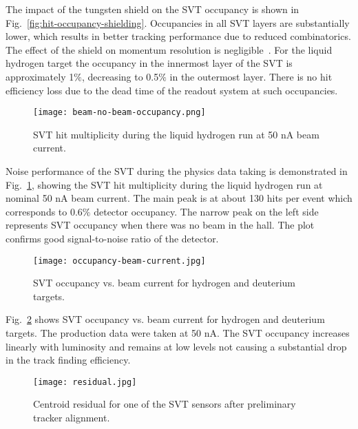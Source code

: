 The impact of the tungsten shield on the SVT occupancy is shown in Fig.~\ref{fig:hit-occupancy-shielding}. Occupancies in all SVT layers are substantially lower, which results in better tracking performance due to reduced combinatorics. The effect of the shield on momentum resolution is negligible~\cite{SHIELDNOTE}. For the liquid hydrogen target the occupancy in the innermost layer of the SVT is approximately 1$\%$, decreasing to 0.5$\%$ in the outermost layer. There is no hit efficiency loss due to the dead time of the readout system at such occupancies.

\begin{figure}[hbt] 
\centering 
\texttt{[image: beam-no-beam-occupancy.png]}
\caption{SVT hit multiplicity during the liquid hydrogen run at 50 nA beam current.}
\label{fig:beam-no-beam-occupancy}
\end{figure}

Noise performance of the SVT during the physics data taking is demonstrated in Fig.~\ref{fig:beam-no-beam-occupancy}, showing the SVT hit multiplicity during the liquid hydrogen run at nominal 50 nA beam current. The main peak is at about 130 hits per event which corresponds to 0.6$\%$ detector occupancy. The narrow peak on the left side represents SVT occupancy when there was no beam in the hall. The plot confirms good signal-to-noise ratio of the detector. 

\begin{figure}[hbt] 
\centering 
\texttt{[image: occupancy-beam-current.jpg]}
\caption{SVT occupancy vs. beam current for hydrogen and deuterium targets.}
\label{fig:occupancy-beam-current}
\end{figure}

Fig.~\ref{fig:occupancy-beam-current} shows SVT occupancy vs. beam current for hydrogen and deuterium targets. The production data were taken at 50 nA. The SVT occupancy increases linearly with luminosity and remains at low levels not causing a substantial drop in the track finding efficiency.

\begin{figure}[hbt] 
\centering 
\texttt{[image: residual.jpg]}
\caption{Centroid residual for one of the SVT sensors after preliminary tracker alignment.}
\label{fig:residual}
\end{figure}

